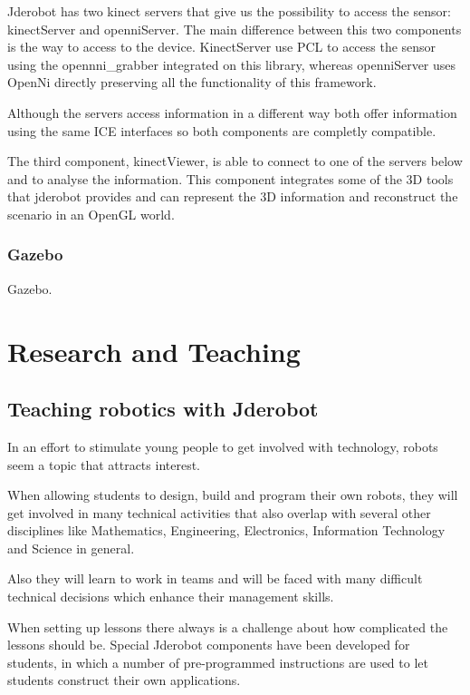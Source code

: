 \documentclass[twocolumn]{svjour3}          %
\begin{document}
Jderobot has two kinect servers that give us the possibility to access the sensor: kinectServer and openniServer. The main difference between this two components is the way to access to the device. KinectServer use PCL to access the sensor using the opennni\_grabber integrated on this library, whereas openniServer uses OpenNi directly preserving all the functionality of this framework. 

Although the servers access information in a different way both offer information using the same ICE interfaces so both components are completly compatible. 

The third component, kinectViewer, is able to connect to one of the servers below and to analyse  the information. This component integrates some of the 3D tools that jderobot provides and can represent the 3D information and reconstruct the scenario in an OpenGL world. 

\subsubsection{Gazebo}

Gazebo.

\section{Research and Teaching}
\label{ref:research}

\subsection{Teaching robotics with Jderobot}

In an effort to stimulate young people to get involved with technology, robots seem a topic that attracts interest.

When allowing students to design, build and program their own robots, they will get involved in many technical activities that also overlap with several other disciplines like Mathematics, Engineering, Electronics, Information Technology and Science in general.

Also they will learn to work in teams and will be faced with many difficult technical decisions which enhance their management skills.

When setting up lessons there always is a challenge about how complicated the lessons should be. Special Jderobot components have been developed for students, in which a number of pre-programmed instructions are used to let students construct their own applications.
\end{document}
